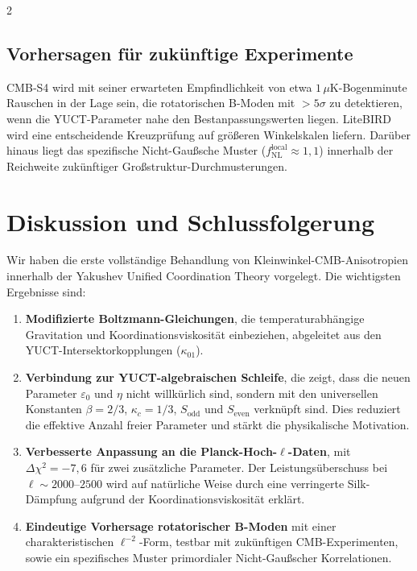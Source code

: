 \documentclass[11pt,a4paper]{article}
\begin{document}
\begin{multicols}{2}
		\subsection{Vorhersagen für zukünftige Experimente}
		
		CMB‑S4 wird mit seiner erwarteten Empfindlichkeit von etwa $1\,\mu$K-Bogenminute Rauschen in der Lage sein, die rotatorischen B-Moden mit $>5\sigma$ zu detektieren, wenn die YUCT-Parameter nahe den Bestanpassungswerten liegen. LiteBIRD wird eine entscheidende Kreuzprüfung auf größeren Winkelskalen liefern. Darüber hinaus liegt das spezifische Nicht-Gaußsche Muster ($f_{\mathrm{NL}}^{\mathrm{local}} \approx 1,1$) innerhalb der Reichweite zukünftiger Großstruktur-Durchmusterungen.
		
		\section{Diskussion und Schlussfolgerung}
		
		Wir haben die erste vollständige Behandlung von Kleinwinkel-CMB-Anisotropien innerhalb der Yakushev Unified Coordination Theory vorgelegt. Die wichtigsten Ergebnisse sind:
		\begin{enumerate}
			\item \textbf{Modifizierte Boltzmann-Gleichungen}, die temperaturabhängige Gravitation und Koordinationsviskosität einbeziehen, abgeleitet aus den YUCT-Intersektorkopplungen ($\kappa_{01}$).
			\item \textbf{Verbindung zur YUCT-algebraischen Schleife}, die zeigt, dass die neuen Parameter $\varepsilon_0$ und $\eta$ nicht willkürlich sind, sondern mit den universellen Konstanten $\beta=2/3$, $\kappa_c=1/3$, $S_{\mathrm{odd}}$ und $S_{\mathrm{even}}$ verknüpft sind. Dies reduziert die effektive Anzahl freier Parameter und stärkt die physikalische Motivation.
			\item \textbf{Verbesserte Anpassung an die Planck-Hoch-$\ell$-Daten}, mit $\Delta\chi^2 = -7,6$ für zwei zusätzliche Parameter. Der Leistungsüberschuss bei $\ell \sim 2000$--$2500$ wird auf natürliche Weise durch eine verringerte Silk-Dämpfung aufgrund der Koordinationsviskosität erklärt.
			\item \textbf{Eindeutige Vorhersage rotatorischer B-Moden} mit einer charakteristischen $\ell^{-2}$-Form, testbar mit zukünftigen CMB-Experimenten, sowie ein spezifisches Muster primordialer Nicht-Gaußscher Korrelationen.
		\end{enumerate}
		

\end{multicols}
\end{document}
